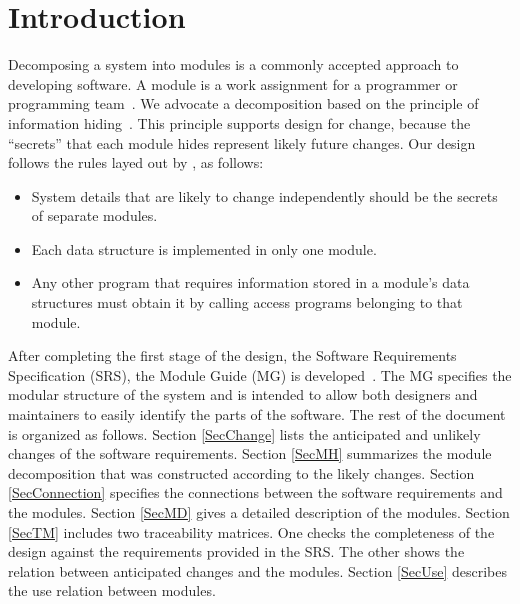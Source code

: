\documentclass[12pt, titlepage]{article}
\begin{document}
\newpage

\tableofcontents

\listoftables

\listoffigures

\newpage


\section{Introduction}

Decomposing a system into modules is a commonly accepted approach to developing software.
A module is a work assignment for a programmer or programming team~\citep{ParnasEtAl1984}.
We advocate a decomposition based on the principle of information hiding~\citep{Parnas1972a}.
This principle supports design for change, because the ``secrets'' that each module hides represent likely future changes.
Our design follows the rules layed out by \citet{ParnasEtAl1984}, as follows:
\begin{itemize}
\item System details that are likely to change independently should be the secrets of separate modules.
\item Each data structure is implemented in only one module.
\item Any other program that requires information stored in a module's data structures must obtain it by calling access programs belonging to that module.
\end{itemize}

After completing the first stage of the design, the Software Requirements
Specification (SRS), the Module Guide (MG) is developed~\citep{ParnasEtAl1984}.
The MG specifies the modular structure of the system and is intended to allow both designers and maintainers to easily identify the parts of the software.
The rest of the document is organized as follows. Section
\ref{SecChange} lists the anticipated and unlikely changes of the software requirements.
Section \ref{SecMH} summarizes the module decomposition that was constructed according to the likely changes.
Section \ref{SecConnection} specifies the connections between the software requirements and the
modules.
Section \ref{SecMD} gives a detailed description of the modules.
Section \ref{SecTM} includes two traceability matrices.
One checks the completeness of the design against the requirements provided in the SRS\@.
The other shows the relation between anticipated changes and the modules.
Section
\ref{SecUse} describes the use relation between modules.
\end{document}
